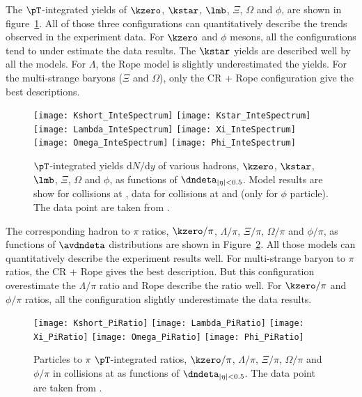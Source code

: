 \documentclass[ALICE,manyauthors]{StrinJet}
\begin{document}
The $\pT$-integrated yields of $\kzero$, $\kstar$, $\lmb$, $\Xi$, $\Omega$ and $\phi$, are shown in figure~\ref{fig:InclIntePar}. All of those three configurations can quantitatively  describe the trends observed in the experiment data. For $\kzero$ and $\phi$ mesons, all the configurations tend to under estimate the data results. The $\kstar$ yields are described well by all the models. For $\Lambda$, the Rope model is slightly underestimated the yields. For the multi-strange baryons ($\Xi$ and $\Omega$), only the CR + Rope configuration give the best descriptions.
\begin{figure}[ht]
	\begin{center}
		\texttt{[image: Kshort\_InteSpectrum]}
		\texttt{[image: Kstar\_InteSpectrum]}
		\texttt{[image: Lambda\_InteSpectrum]}
		\texttt{[image: Xi\_InteSpectrum]}
		\texttt{[image: Omega\_InteSpectrum]}
		\texttt{[image: Phi\_InteSpectrum]}
	\end{center}
	\caption{$\pT$-integrated yields d$N/$d$y$ of various hadrons, $\kzero$, $\kstar$, $\lmb$, $\Xi$, $\Omega$ and $\phi$, as functions of $\dndeta_{|\eta| < 0.5}$. Model results are show for \pp collisions at \seven, data for \pp collisions at \seven and \thirteen (only for $\phi$ particle). The data point are taken from \cite{ALICE:2016fzo, ALICE:2019etb}.}
	\label{fig:InclIntePar}
\end{figure}

The corresponding hadron to $\pi$ ratios,  $\kzero/\pi$, $\Lambda/\pi$, $\Xi/\pi$, $\Omega/\pi$ and $\phi/\pi$, as functions of $\avdndeta$ distributions are shown in Figure~\ref{fig:InclIntePartoPiRatio}. 
All those models can quantitatively describe the experiment results well. For multi-strange baryon to $\pi$ ratios, the CR + Rope gives the best description. But this configuration overestimate the $\Lambda/\pi$ ratio and Rope describe the ratio well. For $\kzero/\pi$ and $\phi/\pi$ ratios, all the configuration slightly underestimate the data results.
\begin{figure}[ht]
	\begin{center}
		\texttt{[image: Kshort\_PiRatio]}
		\texttt{[image: Lambda\_PiRatio]}
		\texttt{[image: Xi\_PiRatio]}
		\texttt{[image: Omega\_PiRatio]}
		\texttt{[image: Phi\_PiRatio]}	
	\end{center}
	\caption{Particles to $\pi$ $\pT$-integrated ratios, $\kzero/\pi$, $\Lambda/\pi$, $\Xi/\pi$, $\Omega/\pi$ and $\phi/\pi$ in \pp collisions at \seven as functions of $\dndeta_{|\eta| < 0.5}$. The data point are taken from  \cite{ALICE:2016fzo, ALICE:2018pal}.}
	\label{fig:InclIntePartoPiRatio}
\end{figure}
\end{document}
